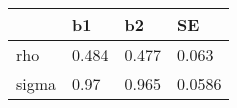 \begin{tabular}{llll}
\hline 
  & b1 & b2 & SE \\ 
\hline 
rho & 0.484 & 0.477 & 0.063 \\ 
sigma & 0.97 & 0.965 & 0.0586 \\ 
\hline 
\end{tabular}